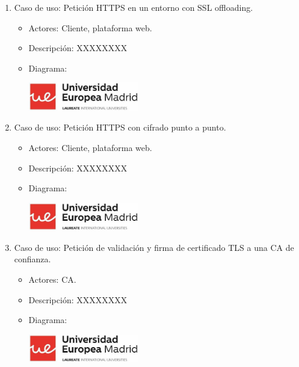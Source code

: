 \begin{enumerate}
  \item Caso de uso: Petición HTTPS en un entorno con SSL offloading.
    \begin{itemize}
      \item Actores: Cliente, plataforma web.
      \item Descripción: XXXXXXXX
      \item Diagrama:
        \begin{center}
          \label{fig:CasoUsoXX}
          \includegraphics[width=0.4\textwidth]{fig/CasoUso1}
        \end{center}
    \end{itemize}
  \item Caso de uso: Petición HTTPS con cifrado punto a punto.
    \begin{itemize}
      \item Actores: Cliente, plataforma web.
      \item Descripción: XXXXXXXX
      \item Diagrama:
        \begin{center}
          \label{fig:CasoUsoXXX}
          \includegraphics[width=0.4\textwidth]{fig/CasoUso1}
        \end{center}
    \end{itemize}
  \item Caso de uso: Petición de validación y firma de certificado TLS a una CA de confianza.
    \begin{itemize}
      \item Actores: \acrlong{CA}.
      \item Descripción: XXXXXXXX
      \item Diagrama:
        \begin{center}
          \label{fig:CasoUsoXXXXX}
          \includegraphics[width=0.4\textwidth]{fig/CasoUso1}
        \end{center}
    \end{itemize}
\end{enumerate}


